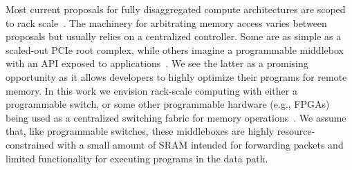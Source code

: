 Most current proposals for fully disaggregated compute architectures
are scoped to rack
scale~\cite{disandapp,the-machine,intel-rack,firebox}.  The machinery
for arbitrating memory access varies between proposals but usually
relies on a centralized controller.  Some are as simple as a
scaled-out PCIe root complex, while others imagine a programmable
middlebox with an API exposed to applications~\cite{disandapp}. We
see the latter as a promising opportunity as it allows developers to
highly optimize their programs for remote memory.  In this work we
envision rack-scale computing with either a programmable switch, or
some other programmable hardware (e.g., FPGAs) being used as a
centralized switching fabric for memory operations~\cite{supernic}. We
assume that, like programmable switches, these middleboxes are highly
resource-constrained with a small amount of SRAM intended for
forwarding packets and limited functionality for executing programs in
the data path.



